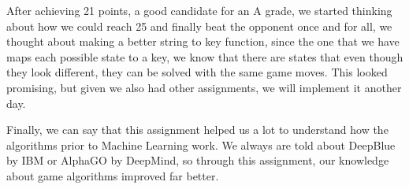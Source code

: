 \documentclass[12pt]{article}
\begin{document}
After achieving 21 points, a good candidate for an A grade, we started thinking about how we could reach 25 and finally beat the opponent once and for all, we thought about making a better string to key function, since the one that we have maps each possible state to a key, we know that there are states that even though they look different, they can be solved with the same game moves. This looked promising, but given we also had other assignments, we will implement it another day.

Finally, we can say that this assignment helped us a lot to understand how the algorithms prior to Machine Learning work. We always are told about DeepBlue by IBM or AlphaGO by DeepMind, so through this assignment, our knowledge about game algorithms improved far better.
\end{document}
